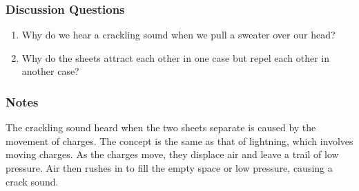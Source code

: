 \subsubsection*{Discussion Questions}
\begin{enumerate}
\item{Why do we hear a crackling sound when we pull a sweater over our head?}
\item{Why do the sheets attract each other in one case but repel each other in another case?}
\end{enumerate}

\subsubsection*{Notes}
The crackling sound heard when the two sheets separate is caused by the movement of charges. The concept is the same as that of lightning, which involves moving charges. As the charges move, they displace air and leave a trail of low pressure. Air then rushes in to fill the empty space or low pressure, causing a crack sound. 


